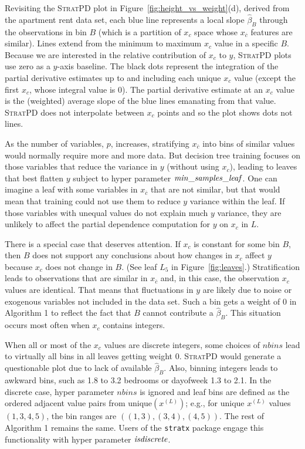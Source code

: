 \documentclass[12pt]{article}
\newcommand{\figref}[1]{Figure~\ref{#1}}
\newcommand{\spd}{\fontfamily{cmr}\textsc{\small StratPD}}
\newcommand{\xnc}{$x_{\overline{c}}$}
\begin{document}
Revisiting the \spd{} plot in \figref{fig:height_vs_weight}(d), derived from the apartment rent data set, each blue line represents a local slope $\hat{\beta}_B$ through the observations in bin $B$ (which is a partition of $x_c$ space whose \xnc{} features are similar). Lines extend from the minimum to maximum $x_c$ value in a specific $B$.  Because we are interested in the relative contribution of $x_c$ to $y$, \spd{} plots use zero as a $y$-axis baseline. The black dots represent the integration of the partial derivative estimates up to and including each unique $x_c$ value (except the first $x_c$, whose integral value is 0). The partial derivative estimate at an $x_c$ value is the (weighted) average slope of the blue lines emanating from that value. \spd{} does not interpolate between $x_c$ points and so the plot shows dots not lines. 

As the number of  variables, $p$, increases, stratifying \xnc{} into bins of similar values would normally require more and more data. But decision tree training focuses on those variables that reduce the variance in $y$ (without using $x_c$), leading to leaves that best flatten $y$ subject to hyper parameter ${\it min\_samples\_leaf}$. One can imagine a leaf with some variables in \xnc{} that are not similar, but that would mean that training could not use them to reduce $y$ variance within the leaf. If those variables with unequal values do not explain much $y$ variance, they are unlikely to affect the partial dependence computation for $y$ on $x_c$ in $L$.

There is a special case that deserves attention. If $x_c$ is constant for some bin $B$, then $B$ does not support any conclusions about how changes in $x_c$ affect $y$ because $x_c$ does not change in $B$. (See leaf $L_5$ in \figref{fig:leaves}.)  Stratification leads to observations that are similar in \xnc{} and, in this case, the observation $x_c$ values are identical. That means that fluctuations in $y$ are likely due to noise or exogenous variables not included in the data set.  Such a bin gets a weight of 0 in Algorithm 1 to reflect the fact that $B$ cannot contribute a $\hat{\beta}_B$. This situation occurs most often when $x_c$ contains integers.

When all or most of the $x_c$ values are discrete integers, some choices of $nbins$ lead to virtually all bins in all leaves getting weight 0. \spd{} would generate a questionable plot due to lack of available $\hat{\beta}_B$. Also, binning integers leads to awkward bins, such as 1.8 to 3.2 bedrooms or dayofweek 1.3 to 2.1. In the discrete case, hyper parameter $nbins$ is ignored and leaf bins are defined as the ordered adjacent value pairs from unique$(x^{(L)})$; e.g., for unique $x^{(L)}$ values $(1,3,4,5)$, the bin ranges are $((1,3), (3,4), (4,5))$. The rest of Algorithm 1 remains the same. Users of the {\tt stratx} package engage this functionality with hyper parameter ${\it isdiscrete}$.
\end{document}
